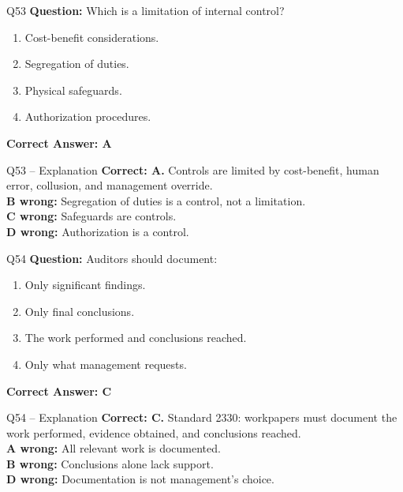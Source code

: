 \documentclass[aspectratio=169,10pt]{beamer}
\begin{document}
	\begin{frame}[t]{Q53}
		\small
		\textbf{Question:} Which is a limitation of internal control?
		\begin{enumerate}[label=\Alph*.,itemsep=1pt,topsep=2pt]
			\item Cost-benefit considerations.
			\item Segregation of duties.
			\item Physical safeguards.
			\item Authorization procedures.
		\end{enumerate}
		\vspace{4pt}
		\textbf{Correct Answer: A}
	\end{frame}
	
	\begin{frame}[t]{Q53 -- Explanation}
		\small
		\textbf{Correct: A.} Controls are limited by cost-benefit, human error, collusion, and management override. \\[4pt]
		\textbf{B wrong:} Segregation of duties is a control, not a limitation. \\[2pt]
		\textbf{C wrong:} Safeguards are controls. \\[2pt]
		\textbf{D wrong:} Authorization is a control.
	\end{frame}
	
	\begin{frame}[t]{Q54}
		\small
		\textbf{Question:} Auditors should document:
		\begin{enumerate}[label=\Alph*.,itemsep=1pt,topsep=2pt]
			\item Only significant findings.
			\item Only final conclusions.
			\item The work performed and conclusions reached.
			\item Only what management requests.
		\end{enumerate}
		\vspace{4pt}
		\textbf{Correct Answer: C}
	\end{frame}
	
	\begin{frame}[t]{Q54 -- Explanation}
		\small
		\textbf{Correct: C.} Standard 2330: workpapers must document the work performed, evidence obtained, and conclusions reached. \\[4pt]
		\textbf{A wrong:} All relevant work is documented. \\[2pt]
		\textbf{B wrong:} Conclusions alone lack support. \\[2pt]
		\textbf{D wrong:} Documentation is not management's choice.
	\end{frame}
	
\end{document}
